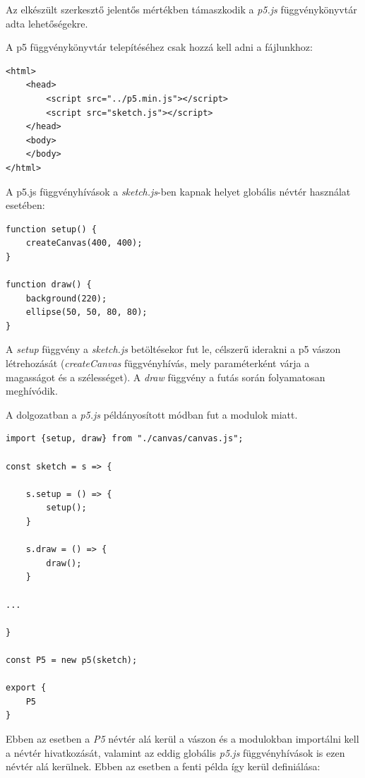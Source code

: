 

Az elkészült szerkesztő jelentős mértékben támaszkodik a \textit{p5.js} függvénykönyvtár adta lehetőségekre.


A p5 függvénykönyvtár telepítéséhez csak hozzá kell adni a fájlunkhoz:

\begin{lstlisting}[style=html]
<html>
	<head>
		<script src="../p5.min.js"></script>
		<script src="sketch.js"></script>
	</head>
	<body>
	</body>
</html>
\end{lstlisting}


A p5.js függvényhívások a \textit{sketch.js}-ben kapnak helyet globális névtér használat esetében:

\begin{lstlisting}[style=es6]
function setup() {
	createCanvas(400, 400);
}

function draw() {
	background(220);
	ellipse(50, 50, 80, 80);
}
\end{lstlisting}

A \textit{setup} függvény a \textit{sketch.js} betöltésekor fut le, célszerű iderakni a p5 vászon létrehozását (\textit{createCanvas} függvényhívás, mely paraméterként várja a magasságot és a szélességet). A \textit{draw} függvény a futás során folyamatosan meghívódik.

A dolgozatban a \textit{p5.js} példányosított módban fut a modulok miatt.
\begin{lstlisting}[style=es6, morekeywords={P5}]
import {setup, draw} from "./canvas/canvas.js";	

const sketch = s => {
	
	s.setup = () => {
		setup();
	}
	
	s.draw = () => {
		draw();
	}

...

}

const P5 = new p5(sketch);

export {
	P5
}
\end{lstlisting}

Ebben az esetben a \textit{P5} névtér alá kerül a vászon és a modulokban importálni kell a névtér hivatkozását, valamint az eddig globális \textit{p5.js} függvényhívások is ezen névtér alá kerülnek. Ebben az esetben a fenti példa így kerül definiálása:

